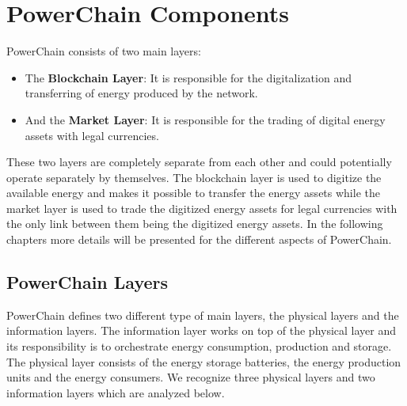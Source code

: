 \section{PowerChain Components}

PowerChain consists of two main layers:
\begin{itemize}
    \item The \textbf{Blockchain Layer}: It is responsible for the digitalization and transferring of energy produced by the network.
    \item And the \textbf{Market Layer}: It is responsible for the trading of digital energy assets with legal currencies.
\end{itemize}

These two layers are completely separate from each other and could potentially operate separately by themselves.
The blockchain layer is used to digitize the available energy and makes it possible to transfer the energy assets while the market layer is used to
trade the digitized energy assets for legal currencies with the only link between them being the digitized energy assets.
In the following chapters more details will be presented for the different aspects of PowerChain.

\pagebreak

\subsection{PowerChain Layers}
PowerChain defines two different type of main layers, the physical layers and the information layers. The information layer works on top of the physical layer and its
responsibility is to orchestrate energy consumption, production and storage. The physical layer consists of the energy storage batteries, the energy production units 
and the energy consumers. We recognize three physical layers and two information layers which are analyzed below.\\

